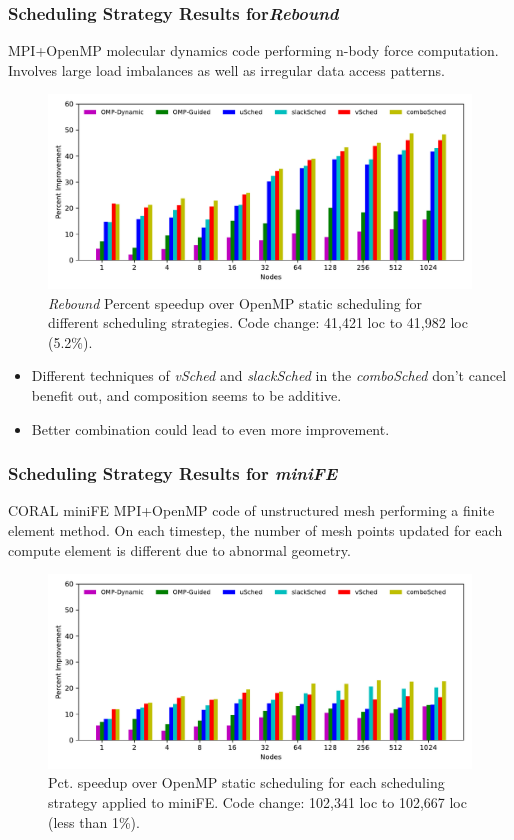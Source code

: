 {\begin{frame}[label=combinednbody]
\frametitle{Scheduling Strategy Results for\textit{Rebound}}
{\tiny MPI+OpenMP molecular dynamics code performing n-body force
computation. Involves large load imbalances as well as irregular data
access patterns.}
\begin{figure}
\includegraphics[scale=0.38]{./plots/app-scaling-strat-nbody-fastNUMA2}
\caption{\tiny \textit{Rebound} Percent speedup over OpenMP static
  scheduling for
  different scheduling strategies. Code change: 41,421 loc to 41,982
  loc (5.2\%).}
\end{figure}
\begin{itemize}
\tiny \item \tiny Different techniques of \textit{vSched} and
\textit{slackSched} in the \textit{comboSched} don't cancel benefit
out, and composition seems to be additive.
\item \tiny Better combination could lead to even more improvement.
\end{itemize}
\end{frame}

\begin{frame}[label=combinedfe]
\frametitle{Scheduling Strategy Results for \textit{miniFE}}

{\tiny CORAL miniFE MPI+OpenMP code of unstructured mesh performing a finite element method. On each timestep, the number of mesh points updated for each compute element is different due to abnormal geometry.}
\begin{figure}[ht!]
\includegraphics[scale=0.38]{./plots/app-scaling-strat-fe-fastNUMA2}
\caption{\tiny Pct. speedup over OpenMP static scheduling for each
scheduling strategy applied to miniFE. Code change: 102,341 loc to 102,667 loc (less than 1\%).}
\end{figure}
\vspace*{-0.2in}
\end{frame}

}
